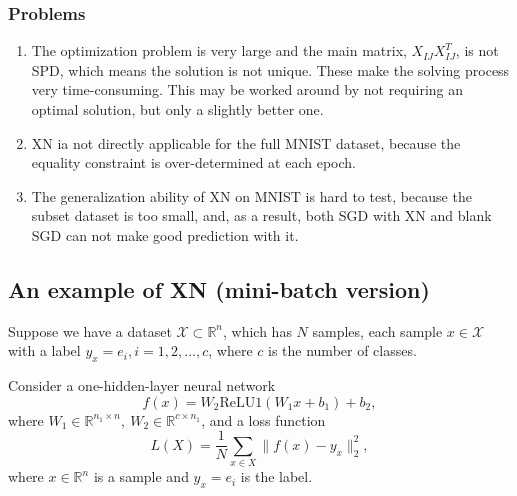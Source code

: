 \subsubsection{Problems}
\begin{enumerate}
	\item 
	The optimization problem is very large and the main matrix, $X_{IJ}X_{IJ}^T$, is not SPD, which means the solution is not unique. These make the solving process very time-consuming. This may be worked around by not requiring an optimal solution, but only a slightly better one.
	\item
	XN ia not directly applicable for the full MNIST dataset, because the equality constraint is over-determined at each epoch.
	\item
	The generalization ability of XN on MNIST is hard to test, because the subset dataset is too small, and, as a result, both SGD with XN and blank SGD can not make good prediction with it.
\end{enumerate}


\subsection{An example of XN (mini-batch version)}
Suppose we have a dataset $\mathcal{X}\subset\mathbb{R}^n$, which has $N$ samples, each sample $x\in \mathcal{X}$ with a label $y_x=e_i,i=1,2,...,c$, where $c$ is the number of classes.

Consider a one-hidden-layer neural network 
\begin{equation}
  \label{1hidden}
f(x)=W_2\text{ReLU1}(W_1x+b_1)+b_2,  
\end{equation}
where $W_1\in\mathbb{R}^{n_1\times n},\ W_2\in\mathbb{R}^{c\times n_1}$, and a loss function \[L(X)=\frac{1}{N}\sum_{x\in X}\|f(x)-y_x\|^2_2,\] where $x\in\mathbb{R}^n$ is a sample and $y_x=e_i$ is the label.

